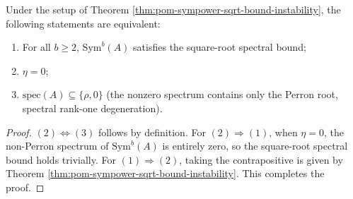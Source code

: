 \begin{corollary}\label{cor:pom-sympower-sqrt-bound-stable-iff-spectral-rankone}
Under the setup of Theorem \ref{thm:pom-sympower-sqrt-bound-instability}, the following statements are equivalent:
\begin{enumerate}
  \item For all \(b\ge 2\), \(\mathrm{Sym}^b(A)\) satisfies the square-root spectral bound;
  \item \(\eta=0\);
  \item \(\mathrm{spec}(A)\subseteq\{\rho,0\}\) (the nonzero spectrum contains only the Perron root, spectral rank-one degeneration).
\end{enumerate}
\end{corollary}
\begin{proof}
\((2)\Leftrightarrow(3)\) follows by definition.
For \((2)\Rightarrow(1)\), when \(\eta=0\), the non-Perron spectrum of \(\mathrm{Sym}^b(A)\) is entirely zero, so the square-root spectral bound holds trivially.
For \((1)\Rightarrow(2)\), taking the contrapositive is given by Theorem \ref{thm:pom-sympower-sqrt-bound-instability}. This completes the proof.
\end{proof}

